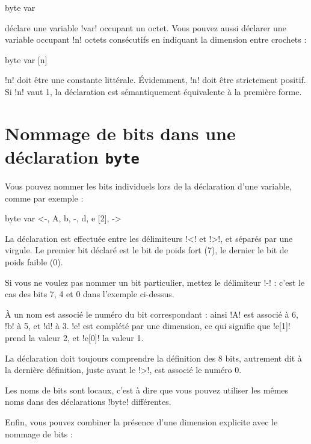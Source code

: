 \begin{piccolo}
byte var 
\end{piccolo}

déclare une variable \pic!var! occupant un octet. Vous pouvez aussi déclarer une variable occupant \pic!n! octets consécutifs en indiquant la dimension entre crochets :

\begin{piccolo}
byte var [n]
\end{piccolo}

\pic!n! doit être une constante littérale. Évidemment, \pic!n! doit être strictement positif. Si \pic!n! vaut 1, la déclaration est sémantiquement équivalente à la première forme.






\section{Nommage de bits dans une déclaration \texttt{byte}}

Vous pouvez nommer les bits individuels lors de la déclaration d'une variable, comme par exemple :

\begin{piccolo}
byte var <-, A, b, -, d, e [2], ->
\end{piccolo}

La déclaration est effectuée entre les délimiteurs \pic!<! et \pic!>!, et séparés par une virgule. Le premier bit déclaré est le bit de poids fort (7), le dernier le bit de poids faible (0).

Si vous ne voulez pas nommer un bit particulier, mettez le délimiteur \pic!-! : c'est le cas des bits 7, 4 et 0 dans l'exemple ci-dessus.

À un nom est associé le numéro du bit correspondant : ainsi \pic!A! est associé à 6, \pic!b! à 5, et \pic!d! à 3. \pic!e! est complété par une dimension, ce qui signifie que \pic!e[1]! prend la valeur 2, et \pic!e[0]! la valeur 1.

La déclaration doit toujours comprendre la définition des 8 bits, autrement dit à la dernière définition, juste avant le \pic!>!, est associé le numéro 0.

Les noms de bits sont locaux, c'est à dire que vous pouvez utiliser les mêmes noms dans des déclarations \pic!byte! différentes.

Enfin, vous pouvez combiner la présence d'une dimension explicite avec le nommage de bits :

